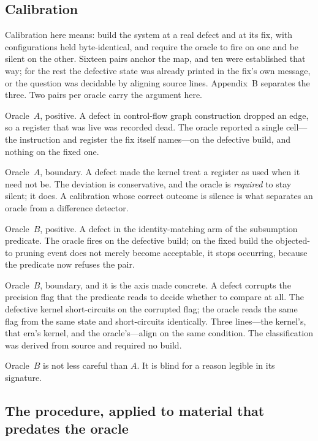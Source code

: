 \subsection{Calibration}

Calibration here means: build the system at a real defect and at its fix, with
configurations held byte-identical, and require the oracle to fire on one and be
silent on the other. Sixteen pairs anchor the map, and ten were established that
way; for the rest the defective state was already printed in the fix's own message,
or the question was decidable by aligning source lines. Appendix~B separates the
three. Two pairs per oracle carry the argument here.

Oracle~$A$, positive. A defect in control-flow graph construction dropped an edge, so a
register that was live was recorded dead. The oracle reported a single cell---the
instruction and register the fix itself names---on the defective build, and nothing
on the fixed one.

Oracle~$A$, boundary. A defect made the kernel treat a register as used when it need not
be. The deviation is conservative, and the oracle is \emph{required} to stay silent;
it does. A calibration whose correct outcome is silence is what separates an oracle
from a difference detector.

Oracle~$B$, positive. A defect in the identity-matching arm of the subsumption predicate.
The oracle fires on the defective build; on the fixed build the objected-to pruning
event does not merely become acceptable, it stops occurring, because the predicate
now refuses the pair.

Oracle~$B$, boundary, and it is the axis made concrete. A defect corrupts the precision
flag that the predicate reads to decide whether to compare at all. The defective
kernel short-circuits on the corrupted flag; the oracle reads the same flag from the
same state and short-circuits identically. Three lines---the kernel's, that era's
kernel, and the oracle's---align on the same condition. The classification was
derived from source and required no build.

Oracle~$B$ is not less careful than $A$. It is blind for a reason legible in its signature.

\subsection{The procedure, applied to material that predates the oracle}

